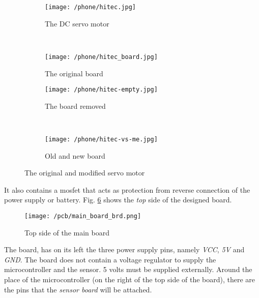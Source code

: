 \begin{figure}[H]
    \centering
    
    \begin{subfigure}[t]{0.3\textwidth}
        \texttt{[image: /phone/hitec.jpg]}
        \caption{The DC servo motor}
        \label{Fig:magnet_placement}
    \end{subfigure}
    ~ %
    \begin{subfigure}[t]{0.3\textwidth}
        \texttt{[image: /phone/hitec\_board.jpg]}
        \caption{The original board}
        \label{Fig:hitec_board}
    \end{subfigure}
    
    \begin{subfigure}[b]{0.3\textwidth}
        \texttt{[image: /phone/hitec-empty.jpg]}
        \caption{The board removed}
        \label{Fig:hitec_empty}
    \end{subfigure}
	~
	\begin{subfigure}[b]{0.3\textwidth}
        \texttt{[image: /phone/hitec-vs-me.jpg]}
        \caption{Old and new board}
        \label{Fig:hitec_vs_me}
    \end{subfigure}    
    
    \caption{The original and modified servo motor}\label{Fig:experimet_setup}
    \label{Fig:original_servo}
\end{figure}

\newpage

It also contains a mosfet that acts as protection from reverse connection of the power supply or battery. Fig. \ref{Fig:main_board_brd} shows the \textit{top} side of the designed board.

\begin{figure}[H]
	\centering
	\texttt{[image: /pcb/main\_board\_brd.png]}
	\caption{Top side of the main board}
	\label{Fig:main_board_brd}
\end{figure} 

The board, has on its left the three power supply pins, namely \textit{VCC}, \textit{5V} and \textit{GND}. The board does not contain a voltage regulator to supply the microcontroller and the sensor. 5 volts must be supplied externally. Around the place of the microcontroller (on the right of the top side of the board), there are the pins that the \textit{sensor board} will be attached.




